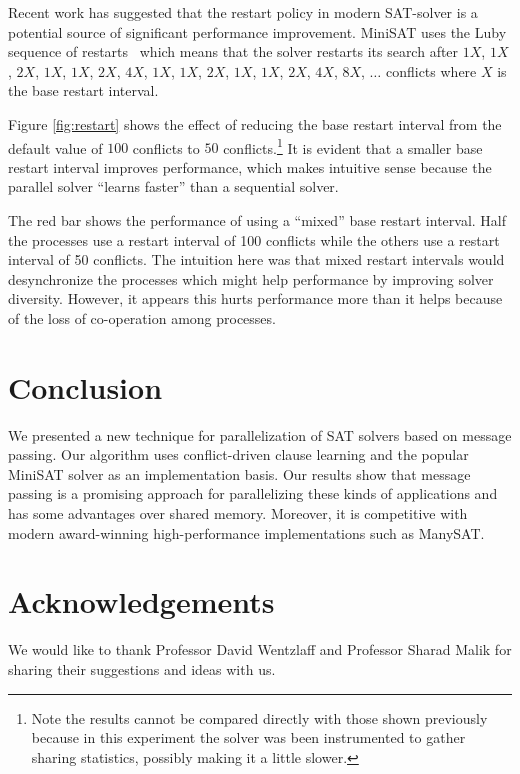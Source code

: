 \documentclass[letterpaper, compsoc, conference]{IEEEtran}
\begin{document}
Recent work \cite{HuangRestart2007} has suggested that the restart policy in
modern SAT-solver is a potential source of significant performance improvement.
MiniSAT uses the Luby sequence of restarts~\cite{Luby93optimalspeedup}
which means that the solver restarts its search after $1X$, $1X$, $2X$, $1X$, $1X$,
$2X$, $4X$, $1X$, $1X$, $2X$, $1X$, $1X$, $2X$, $4X$, $8X$, $\dots$ conflicts
where $X$ is the base restart interval. 

Figure \ref{fig:restart} shows the effect of reducing the base restart interval
from the default value of $100$ conflicts to $50$ conflicts.\footnote{Note the
results cannot be compared directly with those shown previously because in this
experiment the solver was been instrumented to gather sharing statistics,
possibly making it a little slower.} It is evident that a smaller base restart
interval improves performance, which makes intuitive sense because the parallel
solver ``learns faster'' than a sequential solver. 

The red bar shows the performance of using a ``mixed'' base restart interval.
Half the processes use a restart interval of 100 conflicts while the others use a
restart interval of 50 conflicts. The intuition here was that mixed restart
intervals would desynchronize the processes which might help performance by
improving solver diversity. However, it appears this hurts performance more
than it helps because of the loss of co-operation among processes.

\section{Conclusion}
\label{sec:finish}

We presented a new technique for parallelization of SAT solvers based
on message passing. Our algorithm uses conflict-driven clause learning 
and the popular MiniSAT solver as an implementation basis. Our results show that 
message passing is a promising approach for parallelizing these kinds of 
applications and has some advantages over shared memory. Moreover, it is
competitive with modern award-winning high-performance implementations such as ManySAT.
\section*{Acknowledgements}

We would like to thank Professor David Wentzlaff and Professor Sharad Malik for
sharing their suggestions and ideas with us.



\end{document}
